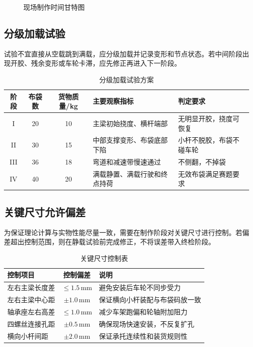 \documentclass[UTF8,a4paper,12pt,fontset=none]{ctexart}
\numberwithin{equation}{section}
\numberwithin{figure}{section}
\numberwithin{table}{section}
\newcommand{\mm}{\,\mathrm{mm}}
\begin{document}
\begin{figure}[H]
\centering
{}
\caption{现场制作时间甘特图}
\label{fig:gantt}
\end{figure}

\subsection{分级加载试验}
试验不宜直接从空载跳到满载，应分级加载并记录变形和节点状态。若中间阶段出现开胶、残余变形或车轮卡滞，应先修正再进入下一阶段。

\begin{table}[H]
\centering
\caption{分级加载试验方案}
\label{tab:load-test-plan}
\begin{tabularx}{\linewidth}{c c c Y Y}
\toprule
\textbf{阶段} & \textbf{布袋数} & \textbf{货物质量}/kg & \textbf{主要观察指标} & \textbf{判定要求} \\\midrule
I & 20 & 10 & 主梁初始挠度、横杆端部 & 无明显开胶，挠度可恢复 \\
II & 30 & 15 & 中部支撑变形、布袋底部下陷 & 小杆不脱胶，布袋不碰车轮 \\
III & 36 & 18 & 弯道和减速带慢速通过 & 不侧翻，不掉袋 \\
IV & 40 & 20 & 满载静置、满载行驶和终点持荷 & 无效布袋满足赛题要求 \\
\bottomrule
\end{tabularx}
\end{table}

\subsection{关键尺寸允许偏差}
为保证理论计算与实物性能尽量一致，需要在制作阶段对关键尺寸进行控制。若偏差超出控制范围，则在静载试验前完成修正，不将误差带入终检阶段。

\begin{table}[H]
\centering
\caption{关键尺寸控制表}
\label{tab:tolerance}
\begin{tabularx}{\linewidth}{Y c Y}
\toprule
\textbf{控制项目} & \textbf{控制偏差} & \textbf{说明} \\\midrule
左右主梁长度差 & $\le 1.5\mm$ & 避免安装后车轮不同步受力 \\
左右主梁中心距 & $\pm 1.0\mm$ & 保证横向小杆装配与布袋码放一致 \\
轴承座左右高差 & $\le 1.0\mm$ & 减少车架跑偏和轮轴附加阻力 \\
四螺丝连接孔距 & $\pm 0.5\mm$ & 确保现场快速安装，不反复扩孔 \\
横向小杆间距 & $\pm 2.0\mm$ & 保证承托连续性和装货规则性 \\
\bottomrule
\end{tabularx}
\end{table}
\end{document}
